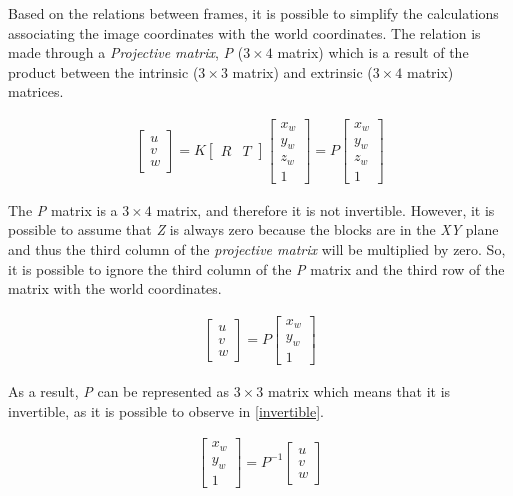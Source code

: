 Based on the relations between frames, it is possible to simplify the calculations associating the image coordinates with the world coordinates. The relation is made through a \textit{Projective matrix}, \textit{P} ($3\times 4$ matrix) which is a result of the product between the intrinsic ($3\times 3$ matrix) and extrinsic ($3\times 4$ matrix) matrices.

\begin{align} 
\begin{bmatrix}
    \textit{u} \\ 
    \textit{v} \\
    \textit{w} 
\end{bmatrix}
=
\textit{K}
\begin{bmatrix}
    \textit{R}  & \textit{T}
\end{bmatrix}
\begin{bmatrix}
   x_{w}\\
   y_{w}\\
   z_{w}\\
	1
\end{bmatrix}
=
\textit{P}
\begin{bmatrix}
   x_{w}\\
   y_{w}\\
   z_{w}\\
	1
\end{bmatrix}
\end{align}

The \textit{P} matrix is a $3\times 4$ matrix, and therefore it is not invertible. However, it is possible to assume that \textit{Z} is always zero because the blocks are in the \textit{XY} plane and thus the third column of the \textit{projective matrix} will be multiplied by zero. So, it is possible to ignore the third column of the \textit{P} matrix and the third row of the matrix with the world coordinates.

\begin{align} 
\begin{bmatrix}
    \textit{u} \\ 
    \textit{v} \\
    \textit{w} 
\end{bmatrix}
=
\textit{P}
\begin{bmatrix}
   x_{w}\\
   y_{w}\\
	1
\end{bmatrix}
\end{align}

As a result, \textit{P} can be represented as $3\times 3$ matrix which means that it is invertible, as it is possible to observe in \ref{invertible}. 

\begin{align}
\begin{bmatrix}
   x_{w}\\
   y_{w}\\
	1
\end{bmatrix} 
=
\textit{P}^{-1}
\begin{bmatrix}
    \textit{u} \\ 
    \textit{v} \\
    \textit{w} 
\end{bmatrix}
\label{invertible}
\end{align}

